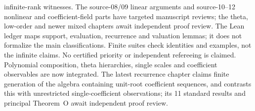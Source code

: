 \documentclass[11pt]{article}
\begin{document}
{infinite-rank witnesses. The source-08/09 linear arguments and source-10--12
nonlinear and coefficient-field parts have targeted manuscript reviews;
the theta, low-order and newer mixed chapters await independent proof
review. The Lean ledger maps support, evaluation, recurrence and valuation
lemmas; it does not formalize the main classifications. Finite suites check
identities and examples, not the infinite claims. No certified priority or
independent refereeing is claimed. Polynomial composition, theta hierarchies,
single scales and coefficient observables are now integrated. The latest
recurrence chapter claims finite generation of the algebra containing
unit-root coefficient sequences, and contrasts this with unrestricted
single-coefficient observations; its 11 standard results and principal
Theorem~O await independent proof review.}
\end{document}
